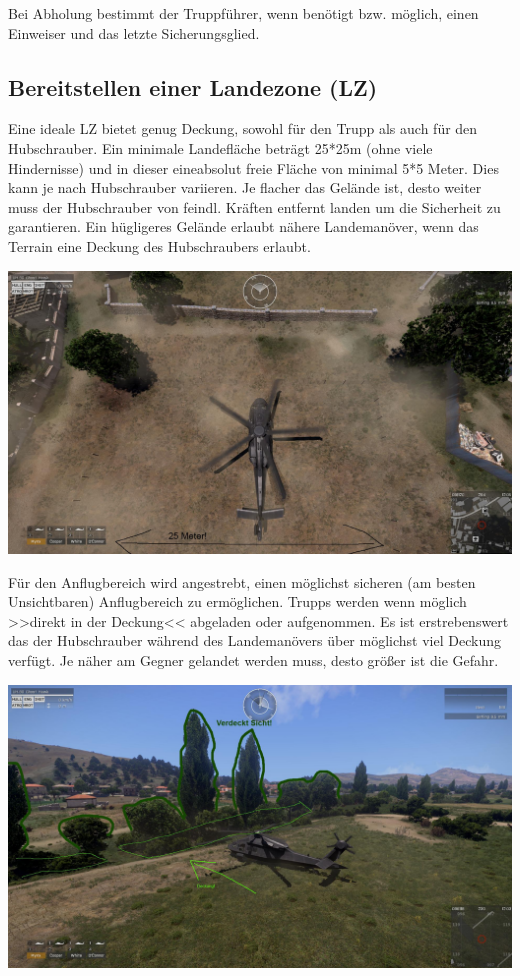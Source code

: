 Bei Abholung bestimmt der Truppführer, wenn benötigt bzw. möglich, einen Einweiser und das letzte Sicherungsglied.

\subsection{Bereitstellen einer Landezone (LZ)}

	Eine ideale LZ bietet genug Deckung, sowohl für den Trupp als auch für den Hubschrauber. Ein minimale Landefläche beträgt 25*25m (ohne viele Hindernisse) und in dieser eineabsolut freie Fläche von minimal 5*5 Meter. Dies kann je nach Hubschrauber variieren. Je flacher das Gelände ist, desto weiter muss der Hubschrauber von feindl. Kräften entfernt landen um die Sicherheit zu garantieren. Ein hügligeres Gelände erlaubt nähere Landemanöver, wenn das Terrain eine Deckung des Hubschraubers erlaubt. \\
	\begin{minipage}[t]{1\textwidth}
		\includegraphics[width=\textwidth]{./Grafiken/Hubschrauber/Landezone.jpg}
	\end{minipage}

	Für den Anflugbereich wird angestrebt, einen möglichst sicheren (am besten Unsichtbaren) Anflugbereich zu ermöglichen. Trupps werden wenn möglich >>direkt in der Deckung<< abgeladen oder aufgenommen. Es ist erstrebenswert das der Hubschrauber während des Landemanövers über möglichst viel Deckung verfügt. Je näher am Gegner gelandet werden muss, desto größer ist die Gefahr. \\
	\begin{minipage}[t]{1\textwidth}
		\includegraphics[width=\textwidth]{./Grafiken/Hubschrauber/verdeckteLandungamSammelpunktmitDeckung.jpg}
	\end{minipage}

